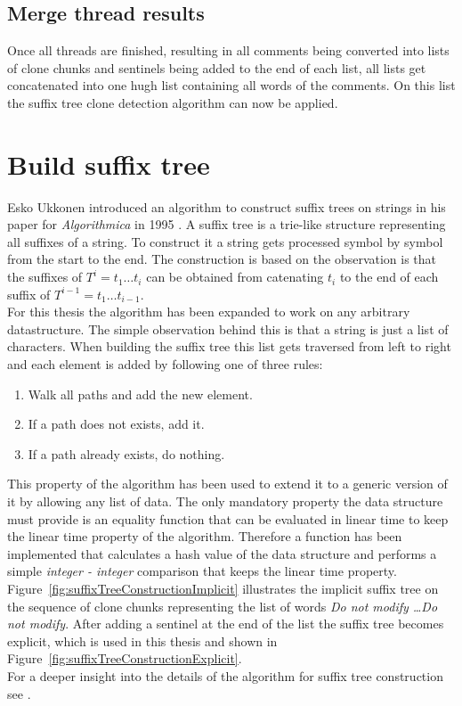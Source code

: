\subsection{Merge thread results}
Once all threads are finished, resulting in all comments being converted into lists of clone chunks and sentinels being added to the end of each list, all lists get concatenated into one hugh list containing all words of the comments. On this list the suffix tree clone detection algorithm can now be applied.

\section{Build suffix tree}
\copied
Esko Ukkonen introduced an algorithm to construct suffix trees on strings in his paper for \textit{Algorithmica} in 1995 \cite{Ukkonen1995}. A suffix tree is a trie-like structure representing all suffixes of a string. To construct it a string gets processed symbol by symbol from the start to the end. The construction is based on the observation is that the suffixes of $T^i = t_1 \dots t_i$ can be obtained from catenating $t_i$ to the end of each suffix of $T^{i-1} = t_1 \dots t_{i-1}$. \\
For this thesis the algorithm has been expanded to work on any arbitrary datastructure. The simple observation behind this is that a string is just a list of characters. When building the suffix tree this list gets traversed from left to right and each element is added by following one of three rules:
\begin{enumerate}
	\item Walk all paths and add the new element.
	\item If a path does not exists, add it.
	\item If a path already exists, do nothing.
\end{enumerate}
This property of the algorithm has been used to extend it to a generic version of it by allowing any list of data. The only mandatory property the data structure must provide is an equality function that can be evaluated in linear time to keep the linear time property of the algorithm. Therefore a function has been implemented that calculates a hash value of the data structure and performs a simple \textit{integer - integer} comparison that keeps the linear time property.\\
Figure~\ref{fig:suffixTreeConstructionImplicit} illustrates the implicit suffix tree on the sequence of clone chunks representing the list of words \textit{Do not modify \dots Do not modify}. After adding a sentinel at the end of the list the suffix tree becomes explicit, which is used in this thesis and shown in Figure~\ref{fig:suffixTreeConstructionExplicit}.\\
For a deeper insight into the details of the algorithm for suffix tree construction see \cite{Ukkonen1995}.




